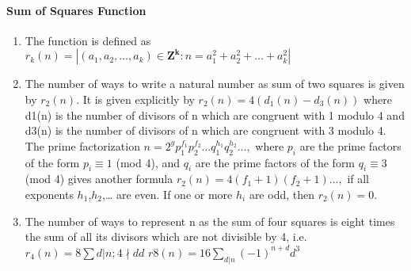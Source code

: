 \paragraph{Sum of Squares Function}\begin{enumerate}

            
            \item The function is defined as
                $r_{k}\left(n\right) = \left|{\left(a_{1},a_{2},…,a_{k} \right) \in \mathbf{Z^{k}} :
                n=a_{1}^{2}+a_{2}^{2}+…+a_{k}^{2}}\right|$
            \item The number of ways to write a natural number as sum of two squares is given by $r_2(n)$. It is given
                explicitly
                by
                $r_{2}\left(n\right) = 4\left(d_{1}\left(n\right) - d_{3}\left(n\right)\right)$
                where d1(n) is the number of divisors of n which are congruent with 1 modulo 4 and d3(n) is the number
                of
                divisors of n which are congruent with 3 modulo 4.  
                The prime factorization $n = 2^{g}p_{1}^{f_{1}}p_{2}^{f_{2}}. . .q_{1}^{h_{1}}q_{2}^{h_{2}}. . . ,$
                where
                $\displaystyle p_{i}$ are the prime factors of the form $\displaystyle p_{i} \equiv 1$ (mod 4), and
                $q_{i}$
                are
                the prime factors of the form $q_{i} \equiv 3$ (mod 4) gives another formula $r_{2}\left(n\right) =
                4\left(f_{1}+1\right)\left(f_{2}+1\right)…,$ if all exponents $h_{1}$,$h_{2}$,… are even. If one or more
                $h_{i}$
                are odd, then $r_{2}\left(n\right) = 0.$
            \item 
                The number of ways to represent n as the sum of four squares is eight times the sum of all its
                    divisors
                    which
                    are not divisible by 4, i.e.
                    $r_{4}\left( n \right) = 8 \displaystyle\sum {d| n;4 \nmid d}d$ 
                        $r{8}\left(n\right) = 16 \displaystyle\sum _{d|n} \left(-1\right)^{n+d}d^{3}$

            
        \end{enumerate}
